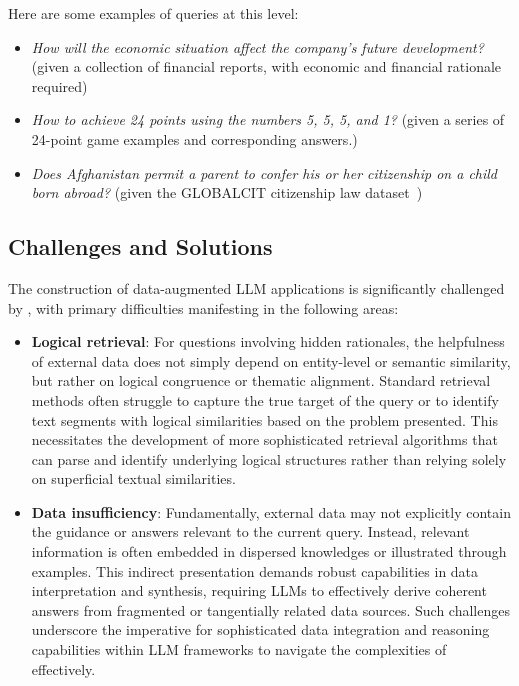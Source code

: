 Here are some examples of queries at this level:
\begin{itemize}
    \item \textit{How will the economic situation affect the company's future development?} (given a collection of financial reports, with economic and financial rationale required)
    \item \textit{How to achieve 24 points using the numbers 5, 5, 5, and 1?} (given a series of 24-point game examples and corresponding answers.)
    \item \textit{Does Afghanistan permit a parent to confer his or her citizenship on a child born abroad?} (given the GLOBALCIT citizenship law dataset~\cite{guha2024legalbench})
\end{itemize}

\subsection{Challenges and Solutions}

The construction of data-augmented LLM applications is significantly challenged by \forthlevel, with primary difficulties manifesting in the following areas:

\begin{itemize}
    \item \textbf{Logical retrieval}: For questions involving hidden rationales, the helpfulness of external data does not simply depend on entity-level or semantic similarity, but rather on logical congruence or thematic alignment. Standard retrieval methods often struggle to capture the true target of the query or to identify text segments with logical similarities based on the problem presented. This necessitates the development of more sophisticated retrieval algorithms that can parse and identify underlying logical structures rather than relying solely on superficial textual similarities.
    \item  \textbf{Data insufficiency}: Fundamentally, external data may not explicitly contain the guidance or answers relevant to the current query. Instead, relevant information is often embedded in dispersed knowledges or illustrated through examples. This indirect presentation demands robust capabilities in data interpretation and synthesis, requiring LLMs to effectively derive coherent answers from fragmented or tangentially related data sources. Such challenges underscore the imperative for sophisticated data integration and reasoning capabilities within LLM frameworks to navigate the complexities of \forthlevel effectively.
\end{itemize}

